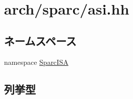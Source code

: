 \hypertarget{asi_8hh}{
\section{arch/sparc/asi.hh}
\label{asi_8hh}
}
\subsection*{ネームスペース}
\begin{DoxyCompactItemize}
\item 
namespace \hyperlink{namespaceSparcISA}{SparcISA}
\end{DoxyCompactItemize}
\subsection*{列挙型}
